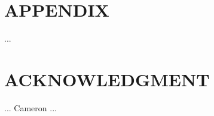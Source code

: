 \documentclass[letterpaper, 10 pt, conference]{ieeeconf}  %
\begin{document}


\section*{APPENDIX}

...

\section*{ACKNOWLEDGMENT}

... Cameron ...




\end{document}
